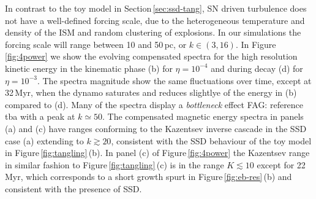 \documentclass[preprint2]{aastex63}
\newcommand{\fag}[1]{\textcolor{midgreen}{FAG: #1}}
\begin{document}
\begin{figure*}
\caption{
Compensated energy spectra at times in Myr given in the legends for 
0.5\,pc resolution.
Rm is super critical for dynamo applying $\eta=10^{-4}$ in
panels (a) and (b) and sub critical or marginal for dynamo applying
$\eta=10^{-3}$ in panels (c) and (d).
Energy spectra are compensated against theoretical profiles of Kazentsev
$k^{3/2}$, (a) and (c), and Kolmogorov $k^{-5/3}$, (b) and (d), 
each represented by the horizontal black dashed lines.
\label{fig:4power}}
\end{figure*}

In contrast to the toy model in Section\,\ref{sec:ssd-tang}, SN driven
turbulence does not have a well-defined forcing scale, due to the heterogeneous
temperature and density of the ISM and random clustering of explosions.
In our simulations the forcing scale will range between 10 and 50\,pc,
or $k\in(3,16)$.
In Figure\,\ref{fig:4power} we show the evolving compensated spectra for the
high resolution kinetic energy in the kinematic phase (b) for $\eta=10^{-4}$
and during decay (d) for $\eta=10^{-3}$.
The spectra magnitude show the same fluctuations over time, except at 32\,Myr,
when the dynamo saturates and reduces slightlye of the energy in (b) compared
to (d). 
Many of the spectra display a \emph{bottleneck} effect \fag{reference tba} with
a peak at $k\simeq50$.
The compensated magnetic energy spectra in panels (a) and (c) have ranges 
conforming to the Kazentsev inverse cascade in the SSD case (a) extending to
$k\gtrsim 20$, consistent with the SSD behaviour of the toy model in
Figure\,\ref{fig:tangling}\,(b).
In panel (c) of Figure\,\ref{fig:4power} the Kazentsev range in similar fashion
to Figure\,\ref{fig:tangling}\,(c) is in the range $K\lesssim10$ except
for 22\,Myr, which corresponds to a short growth spurt in
Figure\,\ref{fig:eb-res}\,(b) and consistent with the presence of SSD.
\end{document}
